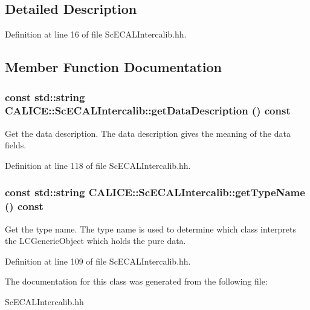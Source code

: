 \subsection{Detailed Description}


Definition at line 16 of file ScECALIntercalib.hh.

\subsection{Member Function Documentation}
\subsubsection[{getDataDescription}]{\setlength{\rightskip}{0pt plus 5cm}const std::string CALICE::ScECALIntercalib::getDataDescription () const\hspace{0.3cm}{\ttfamily  [inline]}}\label{classCALICE_1_1ScECALIntercalib_aab5a0319840be51f59b18b1f0083748c}


Get the data description. The data description gives the meaning of the data fields. 

Definition at line 118 of file ScECALIntercalib.hh.
\subsubsection[{getTypeName}]{\setlength{\rightskip}{0pt plus 5cm}const std::string CALICE::ScECALIntercalib::getTypeName () const\hspace{0.3cm}{\ttfamily  [inline]}}\label{classCALICE_1_1ScECALIntercalib_ac6e28ebb547206a342d96d5adf029bbb}


Get the type name. The type name is used to determine which class interprets the LCGenericObject which holds the pure data. 

Definition at line 109 of file ScECALIntercalib.hh.

The documentation for this class was generated from the following file:\begin{DoxyCompactItemize}
\item 
ScECALIntercalib.hh\end{DoxyCompactItemize}
